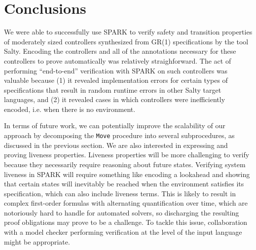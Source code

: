\documentclass[runningheads]{llncs}
\begin{document}
\section{Conclusions}
\label{sec:conclusions}

We were able to successfully use SPARK to verify safety and transition properties of moderately sized controllers 
synthesized from GR(1) specifications by the tool Salty. 
Encoding the controllers and all of the annotations necessary for these controllers to prove automatically was relatively straighforward. 
The act of performing ``end-to-end'' verification with SPARK on such controllers was valuable because (1) it revealed implementation errors for certain 
types of specifications that result in random runtime errors in other Salty target languages, and (2) it revealed cases in which controllers were inefficiently encoded, i.e. when there is no environment.

In terms of future work, we can potentially improve the scalability of our approach by decomposing the \lstinline{Move} procedure 
into several subprocedures, as discussed in the previous section. 
We are also interested in expressing and proving liveness properties. 
Liveness properties will be more challenging to verify because they necessarily require reasoning about future states. 
Verifying system liveness in SPARK will require something like encoding a lookahead and showing that certain states will inevitably be reached 
when the environment satisfies its specification, which can also include liveness terms. 
This is likely to result in complex first-order formulas with alternating quantification over time, which are 
notoriously hard to handle for automated solvers, so discharging the resulting proof obligations may prove to be a challenge.
To tackle this issue, collaboration with a model checker performing verification at the level of the input language might be appropriate.

%
%
%
\newpage


\end{document}
